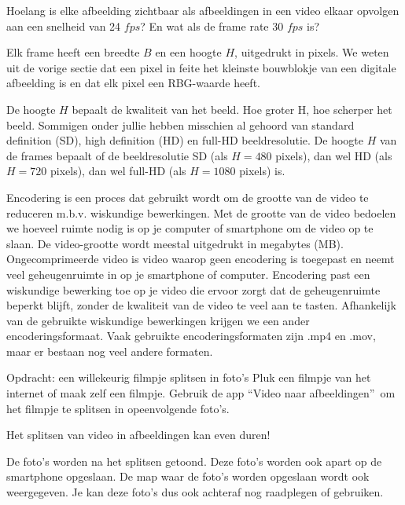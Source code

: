 \begin{oef}
	Hoelang is elke afbeelding zichtbaar als afbeeldingen in een video elkaar opvolgen aan een snelheid van 24 $fps$? 
	En wat als de frame rate 30 $fps$ is?
\end{oef}

Elk frame heeft een breedte $B$ en een hoogte $H$, uitgedrukt in pixels.
We weten uit de vorige sectie dat een pixel in feite het kleinste bouwblokje van een digitale afbeelding is en dat elk pixel een RBG-waarde heeft.


De hoogte $H$ bepaalt de kwaliteit van het beeld. Hoe groter H, hoe scherper het beeld. Sommigen onder jullie hebben misschien al gehoord van standard definition (SD), high definition (HD) en full-HD beeldresolutie. 
De hoogte $H$ van de frames bepaalt of de beeldresolutie SD (als $H=480$ pixels), dan wel HD (als $H=720$ pixels), dan wel full-HD (als $H=1080$ pixels) is.

Encodering is een proces dat gebruikt wordt om de grootte van de video te reduceren m.b.v. wiskundige bewerkingen. Met de grootte van de video bedoelen we hoeveel ruimte nodig is op je computer of smartphone om de video op te slaan. De video-grootte wordt meestal uitgedrukt in megabytes (MB). Ongecomprimeerde video is video waarop geen encodering is toegepast en neemt veel geheugenruimte in op je smartphone of computer. Encodering past een wiskundige bewerking toe op je video die ervoor zorgt dat de geheugenruimte beperkt blijft, zonder de kwaliteit van de video te veel aan te tasten. Afhankelijk van de gebruikte wiskundige bewerkingen krijgen we een ander encoderingsformaat. Vaak gebruikte encoderingsformaten zijn .mp4 en .mov, maar er bestaan nog veel andere formaten.


\begin{opdracht}{Opdracht: een willekeurig filmpje splitsen in foto's}
Pluk een filmpje van het internet of maak zelf een filmpje. Gebruik de app \textquotedblleft Video naar afbeeldingen\textquotedblright \ om het filmpje te splitsen in opeenvolgende foto's. 

\begin{opmerking}
Het splitsen van video in afbeeldingen kan even duren!
\end{opmerking}

De foto's worden na het splitsen getoond. Deze foto's worden ook apart op de smartphone opgeslaan. De map waar de foto's worden opgeslaan wordt ook weergegeven. Je kan deze foto's dus ook achteraf nog raadplegen of gebruiken.

\end{opdracht}

